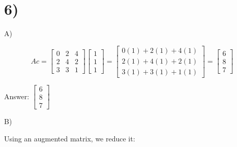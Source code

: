 \documentclass[10pt]{article}
\begin{document}
\newpage
\section*{6)}

A)

$$
A c=\left[\begin{array}{lll}
0 & 2 & 4 \\
2 & 4 & 2 \\
3 & 3 & 1
\end{array}\right]\left[\begin{array}{l}
1 \\
1 \\
1
\end{array}\right]=\left[\begin{array}{l}
0(1)+2(1)+4(1) \\
2(1)+4(1)+2(1) \\
3(1)+3(1)+1(1)
\end{array}\right]=\left[\begin{array}{l}
6 \\
8 \\
7
\end{array}\right]
$$
\begin{tcolorbox}[colback=red!5!white,colframe=red!75!black]
  \centering Answer: $\left[\begin{array}{l}6 \\ 8 \\ 7\end{array}\right]$\\

\end{tcolorbox}

B)

Using an augmented matrix, we reduce it:
\end{document}

